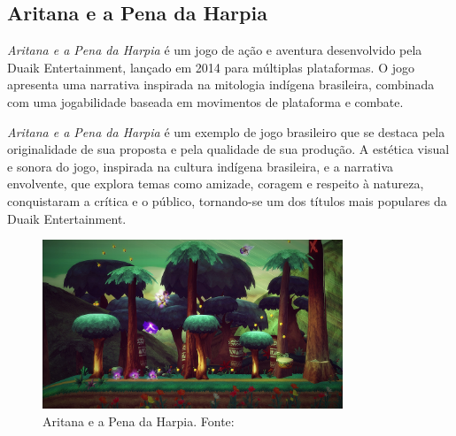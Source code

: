 \subsection{Aritana e a Pena da Harpia}
\textit{Aritana e a Pena da Harpia} é um jogo de ação e aventura desenvolvido pela Duaik Entertainment, lançado em 2014 para múltiplas plataformas. O jogo apresenta uma narrativa inspirada na mitologia indígena brasileira, combinada com uma jogabilidade baseada em movimentos de plataforma e combate.

\textit{Aritana e a Pena da Harpia} é um exemplo de jogo brasileiro que se destaca pela originalidade de sua proposta e pela qualidade de sua produção. A estética visual e sonora do jogo, inspirada na cultura indígena brasileira, e a narrativa envolvente, que explora temas como amizade, coragem e respeito à natureza, conquistaram a crítica e o público, tornando-se um dos títulos mais populares da Duaik Entertainment.

\begin{figure}[H]
    \centering
    \includegraphics[width=0.8\textwidth]{figuras/Aritana.jpg}
    \caption{Aritana e a Pena da Harpia. Fonte: \cite{aritana}}
    \label{fig:aritana}
\end{figure}